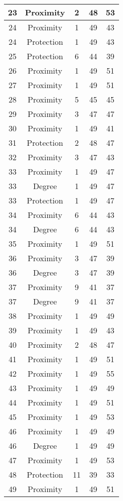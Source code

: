 \documentclass[results.tex]{subfiles}
\begin{document}
\begin{center}
\begin{tabular}{| c || c | c | c | c |}
    \hline
    23 & Proximity & 2 & 48 & 53 \\ 
    \hline
    24 & Proximity & 1 & 49 & 43 \\ 
    \hline
    24 & Protection & 1 & 49 & 43 \\ 
    \hline
    25 & Protection & 6 & 44 & 39 \\ 
    \hline
    26 & Proximity & 1 & 49 & 51 \\ 
    \hline
    27 & Proximity & 1 & 49 & 51 \\ 
    \hline
    28 & Proximity & 5 & 45 & 45 \\ 
    \hline
    29 & Proximity & 3 & 47 & 47 \\ 
    \hline
    30 & Proximity & 1 & 49 & 41 \\ 
    \hline
    31 & Protection & 2 & 48 & 47 \\ 
    \hline
    32 & Proximity & 3 & 47 & 43 \\ 
    \hline
    33 & Proximity & 1 & 49 & 47 \\ 
    \hline
    33 & Degree & 1 & 49 & 47 \\ 
    \hline
    33 & Protection & 1 & 49 & 47 \\ 
    \hline
    34 & Proximity & 6 & 44 & 43 \\ 
    \hline
    34 & Degree & 6 & 44 & 43 \\ 
    \hline
    35 & Proximity & 1 & 49 & 51 \\ 
    \hline
    36 & Proximity & 3 & 47 & 39 \\ 
    \hline
    36 & Degree & 3 & 47 & 39 \\ 
    \hline
    37 & Proximity & 9 & 41 & 37 \\ 
    \hline
    37 & Degree & 9 & 41 & 37 \\ 
    \hline
    38 & Proximity & 1 & 49 & 49 \\ 
    \hline
    39 & Proximity & 1 & 49 & 43 \\ 
    \hline
    40 & Proximity & 2 & 48 & 47 \\ 
    \hline
    41 & Proximity & 1 & 49 & 51 \\ 
    \hline
    42 & Proximity & 1 & 49 & 55 \\ 
    \hline
    43 & Proximity & 1 & 49 & 49 \\ 
    \hline
    44 & Proximity & 1 & 49 & 51 \\ 
    \hline
    45 & Proximity & 1 & 49 & 53 \\ 
    \hline
    46 & Proximity & 1 & 49 & 49 \\ 
    \hline
    46 & Degree & 1 & 49 & 49 \\ 
    \hline
    47 & Proximity & 1 & 49 & 53 \\ 
    \hline
    48 & Protection & 11 & 39 & 33 \\ 
    \hline
    49 & Proximity & 1 & 49 & 51 \\ 
    \hline   \end{tabular}
\end{center}
\end{document}
